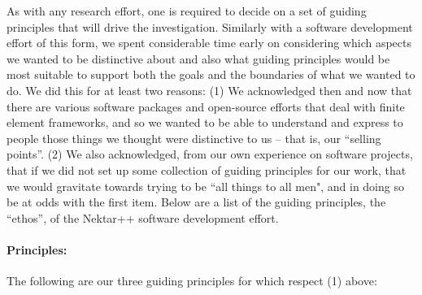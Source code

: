 As with any research effort, one is required to decide on a set of guiding principles that will 
drive the investigation.  Similarly with a software development effort of this form, we  
spent considerable time early on considering which aspects we wanted to be distinctive about {\nek} and also
what guiding principles would be most suitable to support both the goals and the boundaries of what
we wanted to do.  We did this for at least two reasons:  (1) We acknowledged then and now that
there are various software packages and open-source efforts that deal with finite element frameworks,
and so we wanted to be able to understand and express to people those things we thought were
distinctive to us -- that is, our ``selling points''.  (2) We also acknowledged, from our own experience
on software projects, that if we did not set up some collection of guiding principles for our work, that
we would gravitate towards trying to be ``all things to all men", and in doing so be at odds with the
first item.  Below are a list of the guiding principles, the ``ethos'', of the Nektar++ software development
effort.

\paragraph{Principles:}
The following are our three guiding principles for {\nek} which respect (1) above:

